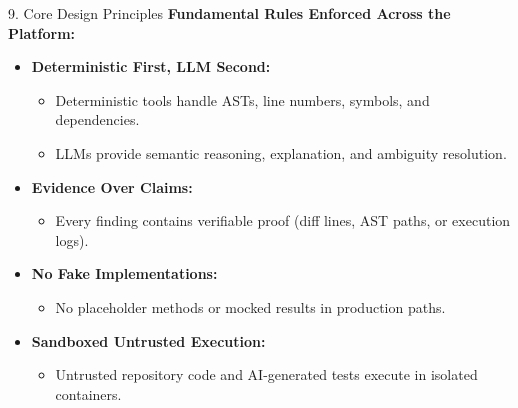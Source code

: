 \documentclass[aspectratio=169,11pt]{beamer}
\begin{document}
\begin{frame}{9. Core Design Principles}
  \textbf{Fundamental Rules Enforced Across the Platform:}
  \vspace{0.25cm}
  \begin{itemize}
    \item \textbf{Deterministic First, LLM Second:}
      \begin{itemize}
        \item Deterministic tools handle ASTs, line numbers, symbols, and dependencies.
        \item LLMs provide semantic reasoning, explanation, and ambiguity resolution.
      \end{itemize}
    \vspace{0.2cm}
    \item \textbf{Evidence Over Claims:}
      \begin{itemize}
        \item Every finding contains verifiable proof (diff lines, AST paths, or execution logs).
      \end{itemize}
    \vspace{0.2cm}
    \item \textbf{No Fake Implementations:}
      \begin{itemize}
        \item No placeholder methods or mocked results in production paths.
      \end{itemize}
    \vspace{0.2cm}
    \item \textbf{Sandboxed Untrusted Execution:}
      \begin{itemize}
        \item Untrusted repository code and AI-generated tests execute in isolated containers.
      \end{itemize}
  \end{itemize}
\end{frame}
\end{document}
